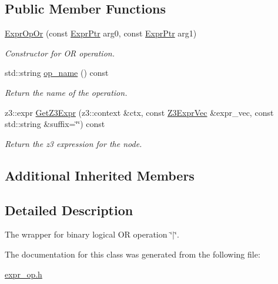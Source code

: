 \subsection*{Public Member Functions}
\begin{DoxyCompactItemize}
\item 
\mbox{\label{classilang_1_1_expr_op_or_ae37fc999c6e5e571326b8596925f13df}} 
\mbox{\hyperlink{classilang_1_1_expr_op_or_ae37fc999c6e5e571326b8596925f13df}{Expr\+Op\+Or}} (const \mbox{\hyperlink{classilang_1_1_expr_a85952b6a34620c4c8cab6bac9c9fdf8c}{Expr\+Ptr}} arg0, const \mbox{\hyperlink{classilang_1_1_expr_a85952b6a34620c4c8cab6bac9c9fdf8c}{Expr\+Ptr}} arg1)
\begin{DoxyCompactList}\small\item\em Constructor for OR operation. \end{DoxyCompactList}\item 
\mbox{\label{classilang_1_1_expr_op_or_ac065615d0fc421d5815219281b8ef4b7}} 
std\+::string \mbox{\hyperlink{classilang_1_1_expr_op_or_ac065615d0fc421d5815219281b8ef4b7}{op\+\_\+name}} () const
\begin{DoxyCompactList}\small\item\em Return the name of the operation. \end{DoxyCompactList}\item 
\mbox{\label{classilang_1_1_expr_op_or_a7a0cb080a390545a2b28c3a421030f2c}} 
z3\+::expr \mbox{\hyperlink{classilang_1_1_expr_op_or_a7a0cb080a390545a2b28c3a421030f2c}{Get\+Z3\+Expr}} (z3\+::context \&ctx, const \mbox{\hyperlink{namespaceilang_adc4eee919aa24fff882d03a48d733c19}{Z3\+Expr\+Vec}} \&expr\+\_\+vec, const std\+::string \&suffix=\char`\"{}\char`\"{}) const
\begin{DoxyCompactList}\small\item\em Return the z3 expression for the node. \end{DoxyCompactList}\end{DoxyCompactItemize}
\subsection*{Additional Inherited Members}


\subsection{Detailed Description}
The wrapper for binary logical OR operation \char`\"{}$\vert$\char`\"{}. 

The documentation for this class was generated from the following file\+:\begin{DoxyCompactItemize}
\item 
\mbox{\hyperlink{expr__op_8h}{expr\+\_\+op.\+h}}\end{DoxyCompactItemize}
